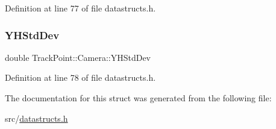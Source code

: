 Definition at line 77 of file datastructs.\+h.

\mbox{\label{struct_track_point_1_1_camera_acb468ec9254645d57e4bfdbf2fec1e1b}} 
\subsubsection{\texorpdfstring{YHStdDev}{YHStdDev}}
{\footnotesize\ttfamily double Track\+Point\+::\+Camera\+::\+Y\+H\+Std\+Dev}



Definition at line 78 of file datastructs.\+h.



The documentation for this struct was generated from the following file\+:\begin{DoxyCompactItemize}
\item 
src/\mbox{\hyperlink{datastructs_8h}{datastructs.\+h}}\end{DoxyCompactItemize}
